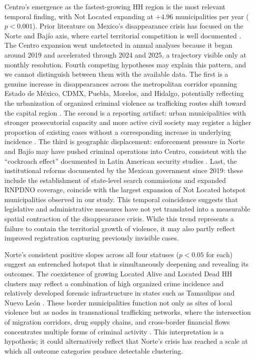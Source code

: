 Centro's emergence as the fastest-growing HH region is the most relevant temporal finding, with Not Located expanding at $+4.96$ municipalities per year ($p < 0.001$).
Prior literature on Mexico's disappearance crisis has focused on the Norte and Baj\'{i}o axis, where cartel territorial competition is well documented \citep{cadena_garrocho_2019, rios_2013}.
The Centro expansion went undetected in annual analyses because it began around 2019 and accelerated through 2024 and 2025, a trajectory visible only at monthly resolution.
Fourth competing hypotheses may explain this pattern, and we cannot distinguish between them with the available data.
The first is a genuine increase in disappearances across the metropolitan corridor spanning Estado de M\'{e}xico, CDMX, Puebla, Morelos, and Hidalgo, potentially reflecting the urbanization of organized criminal violence as trafficking routes shift toward the capital region \citep{vilalta_muggah_2016, medel_2015}.
The second is a reporting artifact: urban municipalities with stronger prosecutorial capacity and more active civil society may register a higher proportion of existing cases without a corresponding increase in underlying incidence \citep{heredia_gonzalez_2022}.
The third is geographic displacement: enforcement pressure in Norte and Baj\'{i}o may have pushed criminal operations into Centro, consistent with the ``cockroach effect'' documented in Latin American security studies \citep{dell_2015, guerrero_gutierrez_2011, bagley_2013}. Last, the institutional reforms documented by the Mexican government since 2019: these include the establishment of state-level search commissions and expanded RNPDNO coverage, coincide with the largest expansion of Not Located hotspot municipalities observed in our study. This temporal coincidence suggests that legislative and administrative measures have not yet translated into a measurable spatial contraction of the disappearance crisis. While this trend represents a failure to contain the territorial growth of violence, it may also partly reflect improved registration capturing previously invisible cases.


Norte's consistent positive slopes across all four statuses ($p < 0.05$ for each) suggest an entrenched hotspot that is simultaneously deepening and revealing its outcomes.
The coexistence of growing Located Alive and Located Dead HH clusters may reflect a combination of high organized crime incidence and relatively developed forensic infrastructure in states such as Tamaulipas and Nuevo Le\'{o}n \citep{atuesta_connection_2025}.
These border municipalities function not only as sites of local violence but as nodes in transnational trafficking networks, where the intersection of migration corridors, drug supply chains, and cross-border financial flows concentrates multiple forms of criminal activity \citep{reyes_remesas_2023}.
This interpretation is a hypothesis; it could alternatively reflect that Norte's crisis has reached a scale at which all outcome categories produce detectable clustering.

